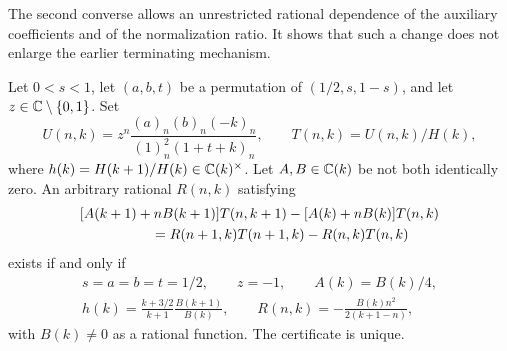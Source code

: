 The second converse allows an unrestricted rational dependence of
the auxiliary coefficients and of the normalization ratio.  It
shows that such a change does not enlarge the earlier terminating
mechanism.
\begin{theorem}
\label{thm:C-wz-EZ-gauge}
Let $0<s<1$, let $(a,b,t)$ be a permutation of $(1/2,s,1-s)$,
and let $z\in\mathbb C\setminus\{0,1\}$.  Set
\[
 U(n,k)=z^n\frac{(a)_n(b)_n(-k)_n}
 {(1)_n^2(1+t+k)_n},\qquad T(n,k)=U(n,k)/H(k),
\]
where $h(k)=H(k+1)/H(k)\in\mathbb C(k)^\times$.  Let
$A,B\in\mathbb C(k)$ be not both identically zero.  An arbitrary rational
$R(n,k)$ satisfying
\begin{equation}\label{eq:C-wz-EZ-gauge-identity}
\begin{split}
 &[A(k+1)+nB(k+1)]T(n,k+1)-[A(k)+nB(k)]T(n,k)\\
 &\hspace{18mm}=R(n+1,k)T(n+1,k)-R(n,k)T(n,k)
\end{split}
\end{equation}
exists if and only if
\begin{gather*}
 s=a=b=t=1/2,\qquad z=-1,\qquad A(k)=B(k)/4,\\
 h(k)=\frac{k+3/2}{k+1}\frac{B(k+1)}{B(k)},\qquad
 R(n,k)=-\frac{B(k)n^2}{2(k+1-n)},
\end{gather*}
with $B(k)\ne0$ as a rational function.  The certificate is unique.
\end{theorem}
